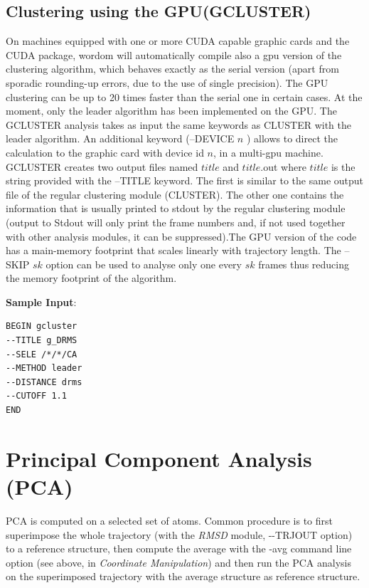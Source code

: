 \documentclass[11pt,twoside,onecolumn,a4paper,openright,notitlepage]{book}[2001/04/21]
\begin{document}
\subsection{Clustering using the GPU(GCLUSTER)}
On machines equipped with one or more CUDA capable graphic cards and the CUDA package, wordom will automatically compile also a gpu version of the clustering algorithm, which behaves exactly as the serial version (apart from sporadic rounding-up errors, due to the use of single precision). The GPU clustering can be up to 20 times faster than the serial one in certain cases. At the moment, only the leader algorithm has been implemented on the GPU. The GCLUSTER analysis takes as input the same keywords as CLUSTER with the leader algorithm. An additional keyword (--DEVICE $n$ ) allows to direct the calculation to the graphic card with device id $n$, in a multi-gpu machine. GCLUSTER creates two output files named $title$ and $title$.out where $title$ is the string provided with the --TITLE keyword. The first is similar to the same output file of the regular clustering module (CLUSTER). The other one contains the information that is usually printed to stdout by the regular clustering module (output to Stdout will only print the frame numbers and, if not used together with other analysis modules, it can be suppressed).The GPU version of the code has a main-memory footprint that scales linearly with trajectory length. The --SKIP $sk$ option can be used to analyse only one every $sk$ frames thus reducing the memory footprint of the algorithm.

\textbf{\large Sample Input}:
\begin{verbatim}
BEGIN gcluster
--TITLE g_DRMS
--SELE /*/*/CA
--METHOD leader
--DISTANCE drms
--CUTOFF 1.1
END
\end{verbatim}


\clearpage

\section{Principal Component Analysis (PCA)}
PCA is computed on a selected set of atoms. Common procedure is to first superimpose the whole trajectory (with the \emph{RMSD} module, -{}-TRJOUT option) to a reference structure, then compute the average with the -avg command line option (see above, in \emph{Coordinate Manipulation}) and then run the PCA analysis on the superimposed trajectory with the average structure as reference structure.\\
\end{document}
